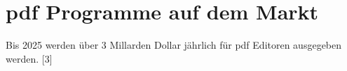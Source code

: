 \chapter{\gls{pdf} Programme auf dem Markt}
Bis 2025 werden über 3 Millarden Dollar jährlich für \gls{pdf} Editoren ausgegeben werden. [3]





